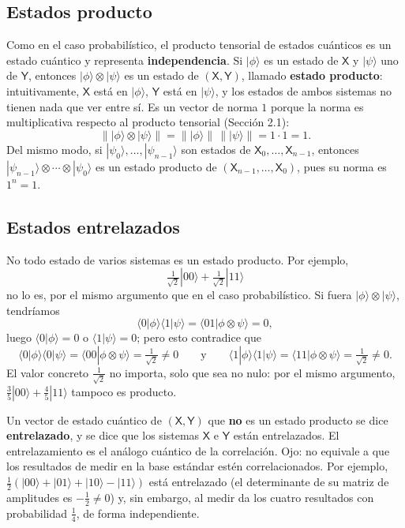 \documentclass[11pt, a4paper, twoside, openright]{report}
\begin{document}
\subsection{Estados producto}

\noindent Como en el caso probabilístico, el producto tensorial de estados cuánticos es un estado cuántico y representa \textbf{independencia}. Si $|\phi\rangle$ es un estado de $\mathsf{X}$ y $|\psi\rangle$ uno de $\mathsf{Y}$, entonces $|\phi\rangle\otimes|\psi\rangle$ es un estado de $(\mathsf{X},\mathsf{Y})$, llamado \textbf{estado producto}: intuitivamente, $\mathsf{X}$ está en $|\phi\rangle$, $\mathsf{Y}$ está en $|\psi\rangle$, y los estados de ambos sistemas no tienen nada que ver entre sí. Es un vector de norma $1$ porque la norma es multiplicativa respecto al producto tensorial (Sección 2.1):
\[ \big\||\phi\rangle\otimes|\psi\rangle\big\| = \big\||\phi\rangle\big\|\,\big\||\psi\rangle\big\| = 1\cdot 1 = 1. \]
Del mismo modo, si $|\psi_0\rangle,\dots,|\psi_{n-1}\rangle$ son estados de $\mathsf{X}_0,\dots,\mathsf{X}_{n-1}$, entonces $|\psi_{n-1}\rangle\otimes\cdots\otimes|\psi_0\rangle$ es un estado producto de $(\mathsf{X}_{n-1},\dots,\mathsf{X}_0)$, pues su norma es $1^n = 1$.

\subsection{Estados entrelazados}

\noindent No todo estado de varios sistemas es un estado producto. Por ejemplo,
\begin{equation}\label{eq:bell1}
\tfrac{1}{\sqrt2}|00\rangle + \tfrac{1}{\sqrt2}|11\rangle
\end{equation}
no lo es, por el mismo argumento que en el caso probabilístico. Si fuera $|\phi\rangle\otimes|\psi\rangle$, tendríamos
\[ \langle0|\phi\rangle\langle1|\psi\rangle = \langle01|\phi\otimes\psi\rangle = 0, \]
luego $\langle0|\phi\rangle = 0$ o $\langle1|\psi\rangle = 0$; pero esto contradice que
\[ \langle0|\phi\rangle\langle0|\psi\rangle = \langle00|\phi\otimes\psi\rangle = \tfrac1{\sqrt2} \neq 0 \qquad\text{y}\qquad \langle1|\phi\rangle\langle1|\psi\rangle = \langle11|\phi\otimes\psi\rangle = \tfrac{1}{\sqrt2} \neq 0. \]
El valor concreto $\frac{1}{\sqrt2}$ no importa, solo que sea no nulo: por el mismo argumento, $\frac35|00\rangle + \frac45|11\rangle$ tampoco es producto.

\begin{tcolorbox}[colback=teal!5!white,colframe=teal!75!black,title=\textbf{Definición: Entrelazamiento}]
Un vector de estado cuántico de $(\mathsf{X},\mathsf{Y})$ que \textbf{no} es un estado producto se dice \textbf{entrelazado}, y se dice que los sistemas $\mathsf{X}$ e $\mathsf{Y}$ están entrelazados. El entrelazamiento es el análogo cuántico de la correlación. Ojo: no equivale a que los resultados de medir en la base estándar estén correlacionados. Por ejemplo, $\frac12(|00\rangle + |01\rangle + |10\rangle - |11\rangle)$ está entrelazado (el determinante de su matriz de amplitudes es $-\frac12 \neq 0$) y, sin embargo, al medir da los cuatro resultados con probabilidad $\frac14$, de forma independiente.
\end{tcolorbox}
\end{document}

